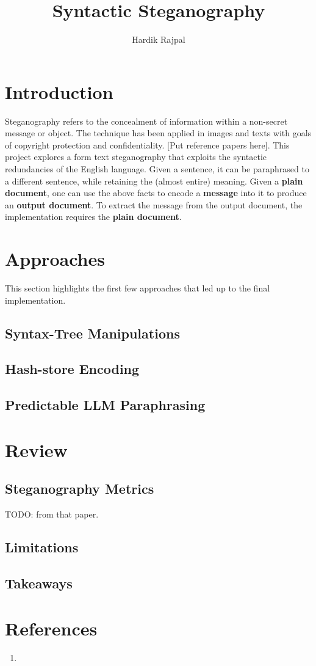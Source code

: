 \documentclass{article}
\author{Hardik Rajpal}
\title{Syntactic Steganography}
\begin{document}
\maketitle
\section{Introduction}
Steganography refers to the concealment of information within a non-secret message or object. The technique has been applied in images and texts with goals of copyright protection and confidentiality. [Put reference papers here]. This project explores a form text steganography that exploits the syntactic redundancies of the English language. Given a sentence, it can be
paraphrased to a different sentence, while retaining the (almost entire) meaning. Given a \textbf{plain document}, one can use the above facts to encode a \textbf{message} into it to produce an \textbf{output document}. To extract the message from the output document, the implementation requires the \textbf{plain document}.
\section{Approaches}
This section highlights the first few approaches that led up to the final implementation.
\subsection{Syntax-Tree Manipulations}
\subsection{Hash-store Encoding}
\subsection{Predictable LLM Paraphrasing}
\section{Review}
\subsection{Steganography Metrics}
TODO: from that paper.
\subsection{Limitations}
\subsection{Takeaways}
\section{References}
\begin{enumerate}
\item 
\end{enumerate}
\end{document}
